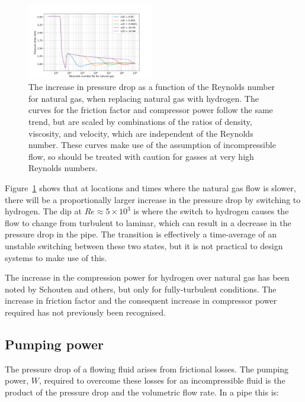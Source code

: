 \documentclass[5p]{elsarticle} %
\begin{document}
\begin{figure}[htb]
\centering
\includegraphics[width=0.49\textwidth]{p2_h2_ratio.png}
\caption{The increase in pressure drop as a function of the Reynolds number for natural gas, when replacing natural gas with hydrogen. The curves for the friction factor and compressor power follow the same trend, but are scaled by combinations of the ratios of density, viscosity, and velocity, which are independent of the Reynolds number. These curves make use of the assumption of incompressible flow, so should be treated with caution for gasses at very high Reynolds numbers.}
\label{fig:pressuredrop}
\end{figure}

Figure~\ref{fig:pressuredrop} shows that at locations and times where the natural gas flow is slower, there will be a proportionally larger increase in the pressure drop by switching to hydrogen.
The dip at $Re\approx5\times10^3$ is where the switch to hydrogen causes the flow to change from turbulent to laminar, which can result in a decrease in the pressure drop in the pipe.
The transition is effectively a time-average of an unstable switching between these two states, but it is not practical to design systems to make use of this.


The increase in the compression power for hydrogen over natural gas has been noted by Schouten\citep{Schouten2004} and others, but only for fully-turbulent conditions. 
The increase in friction factor and the consequent increase in compressor power required has not previously been recognised.

\subsection{Pumping power}
\label{sec:comppower}

The pressure drop of a flowing fluid arises from frictional losses. 
The pumping power, $W$, required to overcome these losses for an incompressible fluid is the product of the pressure drop and the volumetric flow rate. 
In a pipe\citep{Bennet2017} this is:
\end{document}
